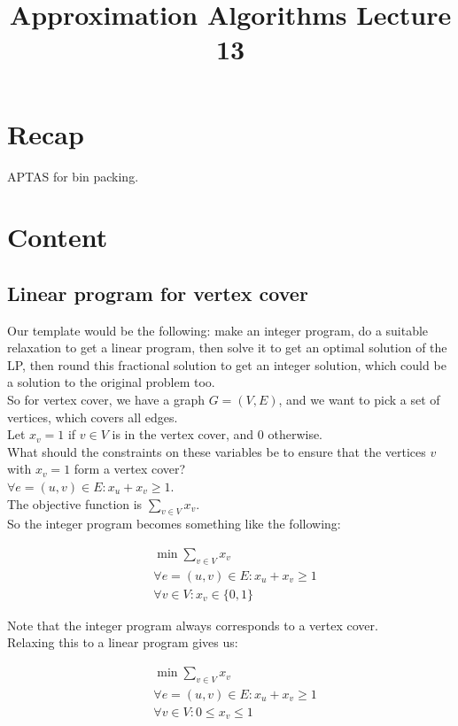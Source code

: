 \documentclass[a4paper]{article}
\title{\textbf{Approximation Algorithms Lecture 13}}
\date{}
\newcommand{\nl}{\vspace{0.2cm}\\}
\begin{document}
\maketitle
\tableofcontents

\section{Recap}

APTAS for bin packing.

\section{Content}

\subsection{Linear program for vertex cover}
Our template would be the following: make an integer program, do a suitable relaxation to get a linear program, then solve it to get an optimal solution of the LP, then round this fractional solution
to get an integer solution, which could be a solution to the original problem too.\nl
So for vertex cover, we have a graph $G = (V, E)$, and we want to pick a set of vertices, which covers all edges.\nl
Let $x_v = 1$ if $v \in V$ is in the vertex cover, and $0$ otherwise.\nl
What should the constraints on these variables be to ensure that the vertices $v$ with $x_v = 1$ form a vertex cover?\nl
$\forall e = (u, v) \in E: x_u + x_v \ge 1$.\nl
The objective function is $\sum_{v \in V} x_v$.\nl
So the integer program becomes something like the following:

\begin{align*}
    &\min \sum_{v \in V} x_v\\
    &\forall e = (u, v) \in E: x_u + x_v \ge 1\\
    &\forall v \in V: x_v \in \{0, 1\}
\end{align*}

Note that the integer program always corresponds to a vertex cover.\nl

Relaxing this to a linear program gives us:

\begin{align*}
    &\min \sum_{v \in V} x_v\\
    &\forall e = (u, v) \in E: x_u + x_v \ge 1\\
    &\forall v \in V: 0 \le x_v \le 1
\end{align*}
\end{document}
